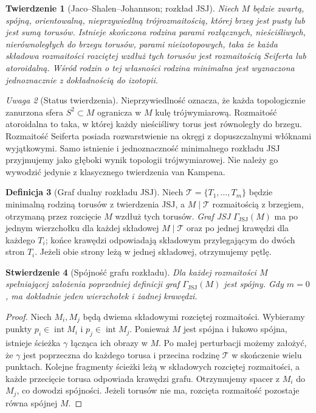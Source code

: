 \documentclass[11pt,a4paper]{report}
\numberwithin{equation}{section}
\theoremstyle{plain}
\newtheorem{twierdzenie}{Twierdzenie}[section]
\newtheorem{stwierdzenie}[twierdzenie]{Stwierdzenie}
\theoremstyle{definition}
\newtheorem{definicja}[twierdzenie]{Definicja}
\theoremstyle{remark}
\newtheorem{uwaga}[twierdzenie]{Uwaga}
\begin{document}
\begin{twierdzenie}[Jaco--Shalen--Johannson; rozkład JSJ]
\label{thm:tg-jsj-theorem}
Niech $M$ będzie zwartą, spójną, orientowalną,
nieprzywiedlną trójrozmaitością, której brzeg jest
pusty lub jest sumą torusów. Istnieje skończona
rodzina parami rozłącznych, nieściśliwych,
nierównoległych do brzegu torusów, parami
nieizotopowych, taka że każda składowa rozmaitości
rozciętej wzdłuż tych torusów jest rozmaitością
Seiferta lub atoroidalną. Wśród rodzin o tej
własności rodzina minimalna jest wyznaczona
jednoznacznie z dokładnością do izotopii.
\end{twierdzenie}

\begin{uwaga}[Status twierdzenia]
Nieprzywiedlność oznacza, że każda topologicznie zanurzona
sfera $S^2\subset M$ ogranicza w $M$ kulę trójwymiarową. Rozmaitość atoroidalna
to taka, w której każdy nieściśliwy torus jest
równoległy do brzegu. Rozmaitość Seiferta posiada
rozwarstwienie na okręgi z dopuszczalnymi włóknami
wyjątkowymi. Samo istnienie i jednoznaczność
minimalnego rozkładu JSJ przyjmujemy jako głęboki
wynik topologii trójwymiarowej. Nie należy go
wywodzić jedynie z klasycznego twierdzenia
van Kampena.
\end{uwaga}

\begin{definicja}[Graf dualny rozkładu JSJ]
Niech $\mathcal T=\{T_1,\ldots,T_m\}$ będzie
minimalną rodziną torusów z twierdzenia JSJ,
a $M\mid\mathcal T$ rozmaitością z brzegiem,
otrzymaną przez rozcięcie $M$ wzdłuż tych torusów.
\emph{Graf JSJ} $\Gamma_{\mathrm{JSJ}}(M)$ ma po jednym
wierzchołku dla każdej składowej $M\mid\mathcal T$
oraz po jednej krawędzi dla każdego $T_i$;
końce krawędzi odpowiadają składowym przylegającym
do dwóch stron $T_i$. Jeżeli obie strony leżą
w jednej składowej, otrzymujemy pętlę.
\end{definicja}

\begin{stwierdzenie}[Spójność grafu rozkładu]
Dla każdej rozmaitości $M$ spełniającej założenia
poprzedniej definicji graf $\Gamma_{\mathrm{JSJ}}(M)$
jest spójny. Gdy $m=0$, ma dokładnie jeden
wierzchołek i żadnej krawędzi.
\end{stwierdzenie}
\begin{proof}
Niech $M_i,M_j$ będą dwiema składowymi rozciętej
rozmaitości. Wybieramy punkty $p_i\in\operatorname{int}M_i$
i $p_j\in\operatorname{int}M_j$. Ponieważ $M$ jest
spójna i łukowo spójna, istnieje ścieżka $\gamma$
łącząca ich obrazy w $M$. Po małej perturbacji
możemy założyć, że $\gamma$ jest poprzeczna do
każdego torusa i przecina rodzinę $\mathcal T$
w skończenie wielu punktach. Kolejne fragmenty
ścieżki leżą w składowych rozciętej rozmaitości,
a każde przecięcie torusa odpowiada krawędzi grafu.
Otrzymujemy spacer z $M_i$ do $M_j$, co dowodzi
spójności. Jeżeli torusów nie ma, rozcięta
rozmaitość pozostaje równa spójnej $M$.
\end{proof}
\end{document}
